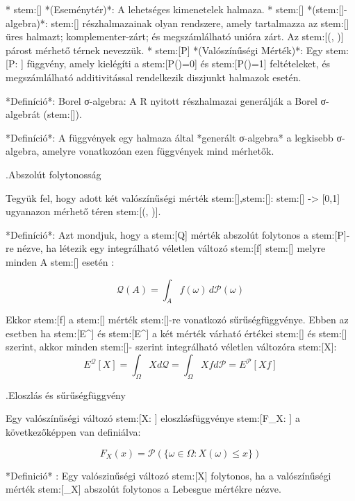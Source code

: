 \documentclass[11pt]{article}
\begin{document}
* stem:[\Omega] *(Eseménytér)*: A lehetséges kimenetelek halmaza.
* stem:[] *(stem:[\sigma]-algebra)*: stem:[\Omega] részhalmazainak olyan rendszere, amely tartalmazza az stem:[\emptyset] üres halmazt; komplementer-zárt; és megszámlálható unióra zárt. Az stem:[(\Omega, )] párost mérhető térnek nevezzük.
* stem:[P] *(Valószínűségi Mérték)*: Egy stem:[P:  \to {}] függvény, amely kielégíti a stem:[P(\emptyset)=0] és stem:[P(\Omega)=1] feltételeket, és megszámlálható additivitással rendelkezik diszjunkt halmazok esetén.

*Definíció*: Borel σ-algebra: A R nyitott részhalmazai generálják a Borel σ-algebrát (stem:[]).

*Definíció*: A függvények egy halmaza által *generált σ-algebra* a legkisebb σ-algebra, amelyre vonatkozóan ezen függvények mind mérhetők.

.Abszolút folytonosság

Tegyük fel, hogy adott két valószínűségi mérték stem:[],stem:[]: stem:[] -> [0,1] ugyanazon mérhető téren stem:[(\Omega, )].

*Definíció*: Azt mondjuk, hogy a stem:[Q] mérték abszolút folytonos a stem:[P]-re nézve, ha létezik egy integrálható véletlen változó stem:[f] stem:[\Omega \to {}] melyre minden A stem:[\in {}] esetén :

\[
\mathcal{Q}(A) = \int_A f (\omega) \, d\mathcal{P}(\omega)
\]

Ekkor stem:[f] a stem:[] mérték stem:[]-re vonatkozó sűrűségfüggvénye. Ebben az esetben ha stem:[E^{}] és stem:[E^{}] a két mérték várható értékei stem:[] és stem:[] szerint, akkor minden stem:[]- szerint integrálható véletlen változóra stem:[X]:
\[
E^{\mathcal{Q}}[X] = \int_{\Omega} Xd\mathcal{Q} = \int_{\Omega} X f d\mathcal{P} = E^{\mathcal{P}}[X f]
\]

.Eloszlás és sűrűségfüggvény

Egy valószínűségi változó stem:[X: \Omega \to {}] eloszlásfüggvénye stem:[F_X:  \to [0,1]] a következőképpen van definiálva:

\[
F_X(x) = \mathcal{P}(\{\omega \in \Omega : X(\omega) \le x\})
\]

*Definició* : Egy valószinűségi változó stem:[X] folytonos, ha a valószínűségi mérték stem:[_X] abszolút folytonos a Lebesgue mértékre nézve.
\end{document}
